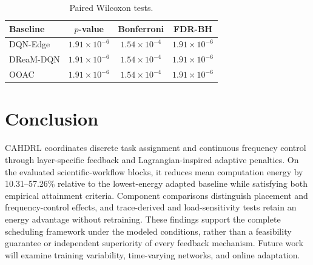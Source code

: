 \documentclass[journal]{IEEEtran}
\begin{document}
\begin{table}[!htb]
\centering
\caption{Paired Wilcoxon tests.}
\label{tab:main_wilcoxon}
\footnotesize
\setlength{\tabcolsep}{3pt}
\renewcommand{\arraystretch}{1.08}
\begin{tabular*}{\columnwidth}{@{\extracolsep{\fill}}lccc@{}}
\toprule
Baseline & $p$-value & Bonferroni & FDR-BH \\
\midrule
DQN-Edge & $1.91\times10^{-6}$ & $1.54\times10^{-4}$ & $1.91\times10^{-6}$ \\
DReaM-DQN & $1.91\times10^{-6}$ & $1.54\times10^{-4}$ & $1.91\times10^{-6}$ \\
OOAC & $1.91\times10^{-6}$ & $1.54\times10^{-4}$ & $1.91\times10^{-6}$ \\
\bottomrule
\end{tabular*}
\end{table}

\section{Conclusion}
\label{sec:conclusion}
CAHDRL coordinates discrete task assignment and continuous frequency control through layer-specific feedback and Lagrangian-inspired adaptive penalties. On the evaluated scientific-workflow blocks, it reduces mean computation energy by 10.31--57.26\% relative to the lowest-energy adapted baseline while satisfying both empirical attainment criteria. Component comparisons distinguish placement and frequency-control effects, and trace-derived and load-sensitivity tests retain an energy advantage without retraining. These findings support the complete scheduling framework under the modeled conditions, rather than a feasibility guarantee or independent superiority of every feedback mechanism. Future work will examine training variability, time-varying networks, and online adaptation.

\balance


\end{document}

